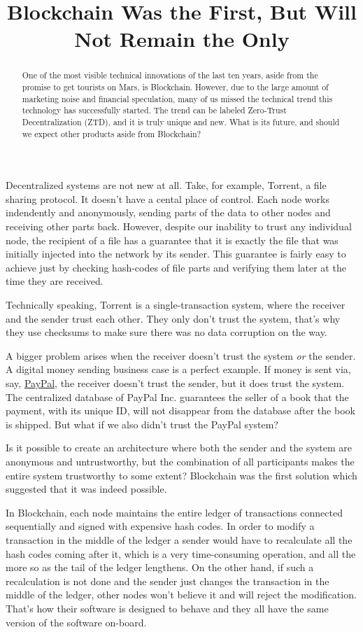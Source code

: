 \documentclass{main}
\title{Blockchain Was the First, But Will Not Remain the Only}
\begin{document}
\begin{abstract}
One of the most visible technical innovations of the last ten years,
aside from the promise to get tourists on Mars, is Blockchain. However,
due to the large amount of marketing noise and financial speculation, many
of us missed the technical trend this technology has successfully started.
The trend can be labeled Zero-Trust Decentralization (ZTD), and it
is truly unique and new. What is its future, and should we
expect other products aside from Blockchain?
\end{abstract}

Decentralized systems are not new at all. Take, for example, Torrent, a file sharing
protocol. It doesn't have a cental place of control. Each node
works indendently and anonymously, sending parts of the data to other nodes
and receiving other parts back.  However, despite our inability to trust
any individual node, the recipient of a file has a guarantee that it is
exactly the file that was initially injected into the network by its sender.
This guarantee is fairly easy to achieve just by checking hash-codes
of file parts and verifying them later at the time they are received.

Technically speaking, Torrent is a single-transaction system, where the
receiver and the sender trust each other. They only don't trust the system,
that's why they use checksums to make sure there was no data corruption
on the way.

A bigger problem arises when the receiver doesn't trust the system \emph{or}
the sender. A digital money sending business case is a perfect example. If money
is sent via, say, \href{https://www.paypal.com}{PayPal}, the receiver doesn't trust the sender, but it
does trust the system. The centralized database of PayPal Inc. guarantees
the seller of a book that the payment, with its unique ID, will
not disappear from the database after the book is shipped. But what if we also didn't trust
the PayPal system?

Is it possible to create an architecture where both the sender and the system
are anonymous and untrustworthy, but the combination of all participants
makes the entire system trustworthy to some extent? Blockchain was the first
solution which suggested that it was indeed possible.

In Blockchain, each node maintains the entire ledger of transactions
connected sequentially and signed with expensive hash codes. In order to modify
a transaction in the middle of the ledger a sender would have to recalculate
all the hash codes coming after it, which is a very time-consuming operation,
and all the more so as the tail of the ledger lengthens. On the other hand,
if such a recalculation is not done and the sender just changes the
transaction in the middle of the ledger, other nodes won't believe it and
will reject the modification. That's how their software is designed to behave
and they all have the same version of the software on-board.
\end{document}
